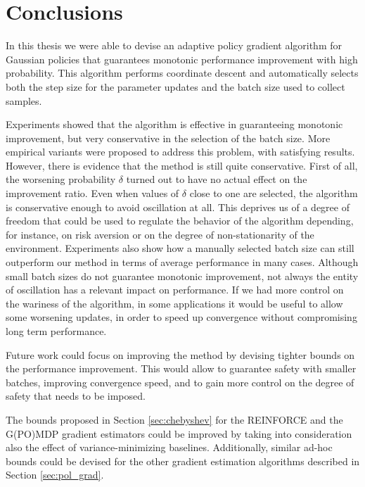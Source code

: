 \chapter{Conclusions}
In this thesis we were able to devise an adaptive policy gradient algorithm for Gaussian policies that guarantees monotonic performance improvement with high probability. This algorithm performs coordinate descent and automatically selects both the step size for the parameter updates and the batch size used to collect samples. 

Experiments showed that the algorithm is effective in guaranteeing monotonic improvement, but very conservative in the selection of the batch size. More empirical variants were proposed to address this problem, with satisfying results. However, there is evidence that the method is still quite conservative.
First of all, the worsening probability $\delta$ turned out to have no actual effect on the improvement ratio. Even when values of $\delta$ close to one are selected, the algorithm is conservative enough to avoid oscillation at all. This deprives us of a degree of freedom that could be used to regulate the behavior of the algorithm depending, for instance, on risk aversion or on the degree of non-stationarity of the environment.
Experiments also show how a manually selected batch size can still outperform our method in terms of average performance in many cases. Although small batch sizes do not guarantee monotonic improvement, not always the entity of oscillation has a relevant impact on performance. If we had more control on the wariness of the algorithm, in some applications it would be useful to allow some worsening updates, in order to speed up convergence without compromising long term performance.

Future work could focus on improving the method by devising tighter bounds on the performance improvement.
This would allow to guarantee safety with smaller batches, improving convergence speed, and to gain more control on the degree of safety that needs to be imposed.

The bounds proposed in Section \ref{sec:chebyshev} for the REINFORCE and the G(PO)MDP gradient estimators could be improved by taking into consideration also the effect of variance-minimizing baselines. Additionally, similar ad-hoc bounds could be devised for the other gradient estimation algorithms described in Section \ref{sec:pol_grad}.

